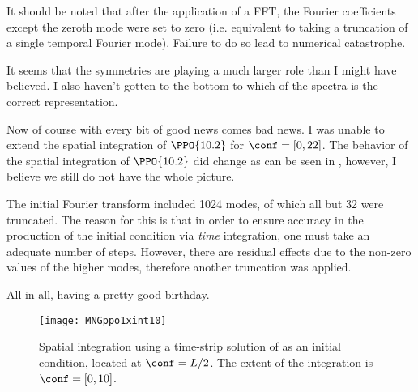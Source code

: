 \begin{description}
{\begin{description}
It should be noted that after the application of a FFT, the Fourier coefficients
except the zeroth mode were set to zero (i.e. equivalent to taking a truncation
of a single temporal Fourier mode). Failure to do so lead to numerical catastrophe.

It seems that the symmetries are playing a much larger role
than I might have believed. I also haven't gotten to the bottom to
which of the spectra is the correct representation.

Now of course with every bit of good news comes bad news. I was unable
to extend the spatial integration of $\PPO{10.2}$ for $\conf = [0,22]$.
The behavior of the spatial integration of $\PPO{10.2}$ did change as can
be seen in , however,
I believe we still do not have the whole picture.

The initial Fourier transform included 1024 modes,
of which all but 32 were truncated. The reason
for this is that in order to ensure accuracy in the production of the initial
condition via \emph{time} integration, one must take an adequate number of steps.
However, there are residual effects due to the non-zero values of the higher modes,
therefore another truncation was applied.

All in all, having a pretty good birthday.

\end{description}
}

\begin{figure}[ht]
\centering
\texttt{[image: MNGppo1xint10]}
\caption{\label{fig:MNGppo1xint10}
Spatial integration using a time-strip solution of 
as an initial condition, located at $\conf = L/2$. The extent of the
integration is $\conf = [0,10]$.}
\end{figure}



\end{description}
